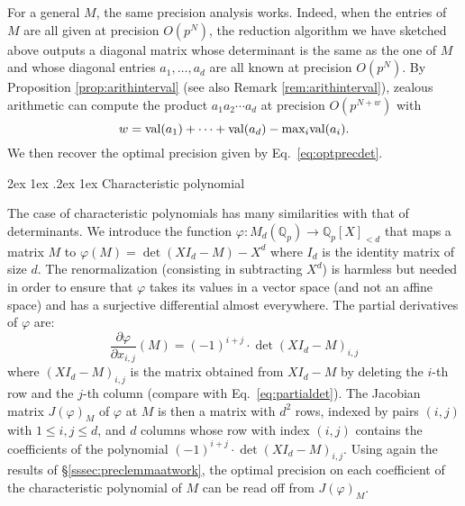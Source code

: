 \documentclass[11pt]{article}
\makeatletter
\numberwithin{equation}{section}
\numberwithin{figure}{section}
\renewcommand\paragraph{\@startsection{paragraph}{4}{\z@}%
                                    {2ex \@plus1ex \@minus.2ex}%
                                    {1ex}%
                                    {\normalfont\normalsize\bfseries}}
\renewcommand{\leq}{\leqslant}
\theoremstyle{definition}
\newcommand{\Q}{\mathbb Q}
\newcommand{\Qp}{\Q_p}
\renewcommand{\max}{\text{\rm max}}
\newcommand{\val}{\text{\rm val}}
\makeatother
\begin{document}
\medskip

For a general $M$, the same precision analysis works. Indeed, when the 
entries of $M$ are all given at precision $O(p^N)$, the reduction 
algorithm we have sketched above outputs a diagonal matrix whose 
determinant is the same as the one of $M$ and whose diagonal entries 
$a_1, \ldots, a_d$ are all known at precision $O(p^N)$. By Proposition 
\ref{prop:arithinterval} (see also Remark \ref{rem:arithinterval}),
zealous arithmetic can compute the product $a_1 a_2 \cdots a_d$ 
at precision $O(p^{N+w})$ with 
$$w = \val(a_1) + \cdots + \val(a_d) - \max_i \val(a_i).$$
We then recover the optimal precision given by Eq.~\eqref{eq:optprecdet}.

\paragraph{Characteristic polynomial}

The case of characteristic polynomials has many similarities with
that of determinants.
We introduce the function $\varphi : M_d(\Qp) \to \Qp[X]_{< d}$
that maps a matrix $M$ to $\varphi(M) = \det(X I_d - M) - X^d$ where
$I_d$ is the identity matrix of size $d$. The renormalization 
(consisting in subtracting $X^d$) is harmless but needed in order to 
ensure that $\varphi$ takes its values in a vector space (and not an
affine space) and has a surjective differential almost everywhere.
The partial derivatives of $\varphi$ are:
$$\frac{\partial \varphi}{\partial x_{i,j}}(M) = (-1)^{i+j} \cdot
\det (X I_d - M)_{i,j}$$
where $(X I_d - M)_{i,j}$ is the matrix obtained from $X I_d {-} M$ 
by deleting the $i$-th row and the $j$-th column (compare with 
Eq.~\eqref{eq:partialdet}). The Jacobian matrix $J(\varphi)_M$ of 
$\varphi$ at $M$
is then a matrix with $d^2$ rows, indexed by pairs $(i,j)$ with
$1 \leq i,j \leq d$, and $d$ columns whose row with index $(i,j)$
contains the coefficients of the polynomial $(-1)^{i+j} \cdot
\det (X I_d - M)_{i,j}$. 
Using again the results of \S\ref{sssec:preclemmaatwork}, the optimal
precision on each coefficient of the characteristic polynomial of
$M$ can be read off from $J(\varphi)_M$.

\medskip
\end{document}
